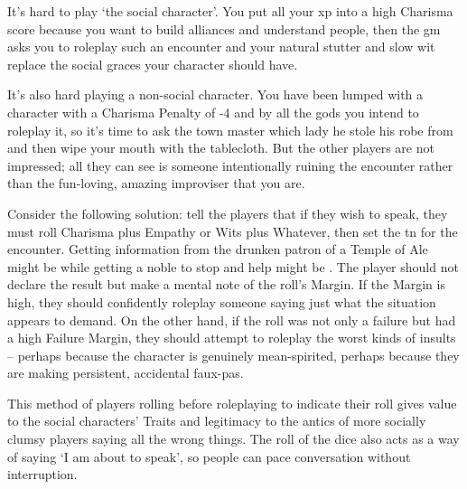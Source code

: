 \begin{multicols}{2}

\noindent
It's hard to play `the social character'.
You put all your \gls{xp} into a high Charisma score because you want to build alliances and understand people, then the \gls{gm} asks you to roleplay such an encounter and your natural stutter and slow wit replace the social graces your character should have.

It's also hard playing a non-social character.
You have been lumped with a character with a Charisma Penalty of -4 and by all the gods you intend to roleplay it, so it's time to ask the town master which lady he stole his robe from and then wipe your mouth with the tablecloth.
But the other players are not impressed; all they can see is someone intentionally ruining the encounter rather than the fun-loving, amazing improviser that you are.

Consider the following solution: tell the players that if they wish to speak, they must roll Charisma plus Empathy or Wits plus Whatever, then set the \gls{tn} for the encounter.
Getting information from the drunken patron of a Temple of Ale might be  while getting a noble to stop and help might be .
The player should not declare the result but make a mental note of the roll's Margin.
If the Margin is high, they should confidently roleplay someone saying just what the situation appears to demand.
On the other hand, if the roll was not only a failure but had a high Failure Margin, they should attempt to roleplay the worst kinds of insults -- perhaps because the character is genuinely mean-spirited, perhaps because they are making persistent, accidental faux-pas.

This method of players rolling before roleplaying to indicate their roll gives value to the social characters' Traits and legitimacy to the antics of more socially clumsy players saying all the wrong things.
The roll of the dice also acts as a way of saying `I am about to speak', so people can pace conversation without interruption.

\end{multicols}
